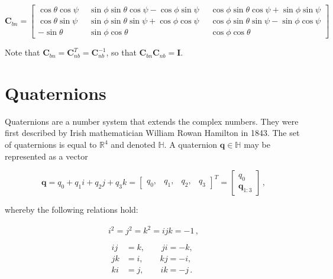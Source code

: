 \begin{equation}
\mathbf{C}_{bn} = {\left[\begin{smallmatrix}
   \cos \theta \cos \psi \; &
    \sin \phi \sin \theta \cos \psi - \cos \phi \sin \psi \; &
    \cos \phi \sin \theta \cos \psi + \sin \phi \sin \psi \\
    \cos \theta \sin \psi \;\; &
    \sin \phi \sin \theta \sin \psi + \cos \phi \cos \psi \;\; &
    \cos \phi \sin \theta \sin \psi - \sin \phi \cos \psi \\
    -\sin \theta \;\; &
    \sin \phi \cos \theta \;\; &
    \cos \phi \cos \theta
  \end{smallmatrix}\right]}
\end{equation}

\noindent
Note that $\mathbf{C}_{bn} = \mathbf{C}^T_{nb} = \mathbf{C}^{-1}_{nb}$, so that $\mathbf{C}^{ }_{bn} \mathbf{C}_{nb} = \mathbf{I}$.  

\section{Quaternions}

Quaternions are a number system that extends the complex numbers. They were first described by Irish mathematician William Rowan Hamilton in 1843. The set of quaternions is equal to $\mathbb{R}^4$ and denoted $\mathbb{H}$. A quaternion $\mathbf{q} \in \mathbb{H}$ may be represented as a vector

\begin{equation}
  \mathbf{q} = q_0 + q_1 i + q_2 j + q_3 k = \begin{bmatrix}
  	q_0, & q_1, & q_2, & q_3
  \end{bmatrix}^T = \begin{bmatrix}
  	q_0 \\ \mathbf{q}_{1:3} 
  \end{bmatrix}\,,
\end{equation}
 
\noindent
whereby the following relations hold:

\begin{equation}
  \begin{matrix}
i^2 =j^2=k^2=ijk =-1\,,\\ \\
  {\begin{split}
  ij & = k, \qquad ji = -k, \\
jk & = i, \qquad kj = -i, \\
ki & = j, \qquad ik = -j\,.
\end{split}}
\end{matrix}
\end{equation}

